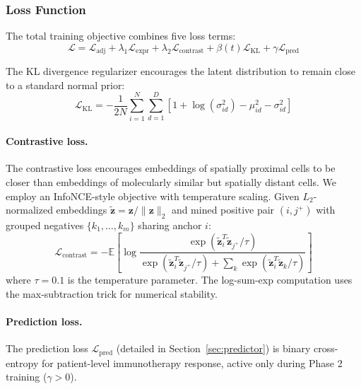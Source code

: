\documentclass{article}
\begin{document}
\subsubsection{Loss Function}

The total training objective combines five loss terms:
\begin{equation}
\label{eq:total_loss}
\mathcal{L} = \mathcal{L}_{\text{adj}} + \lambda_1 \mathcal{L}_{\text{expr}} + \lambda_2 \mathcal{L}_{\text{contrast}} + \beta(t) \mathcal{L}_{\text{KL}} + \gamma \mathcal{L}_{\text{pred}}
\end{equation}

The KL divergence regularizer encourages the latent distribution to remain close to a standard normal prior:
\begin{equation}
\mathcal{L}_{\text{KL}} = -\frac{1}{2N} \sum_{i=1}^N \sum_{d=1}^D \left[ 1 + \log(\sigma_{id}^2) - \mu_{id}^2 - \sigma_{id}^2 \right]
\end{equation}

\paragraph{Contrastive loss.}
\label{sec:contrastive}
The contrastive loss encourages embeddings of spatially proximal cells to be closer than embeddings of molecularly similar but spatially distant cells. We employ an InfoNCE-style objective \citep{oord2018representation} with temperature scaling. Given $L_2$-normalized embeddings $\tilde{\mathbf{z}} = \mathbf{z} / \|\mathbf{z}\|_2$ and mined positive pair $(i, j^+)$ with grouped negatives $\{k_1, \ldots, k_m\}$ sharing anchor $i$:
\begin{equation}
\mathcal{L}_{\text{contrast}} = -\mathbb{E}\left[\log \frac{\exp(\tilde{\mathbf{z}}_i^T \tilde{\mathbf{z}}_{j^+} / \tau)}{\exp(\tilde{\mathbf{z}}_i^T \tilde{\mathbf{z}}_{j^+} / \tau) + \sum_{k} \exp(\tilde{\mathbf{z}}_i^T \tilde{\mathbf{z}}_k / \tau)}\right]
\end{equation}
where $\tau = 0.1$ is the temperature parameter. The log-sum-exp computation uses the max-subtraction trick for numerical stability.

\paragraph{Prediction loss.} The prediction loss $\mathcal{L}_{\text{pred}}$ (detailed in Section~\ref{sec:predictor}) is binary cross-entropy for patient-level immunotherapy response, active only during Phase 2 training ($\gamma > 0$).
\end{document}
